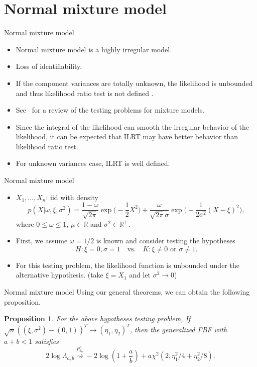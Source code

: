 \documentclass{beamer}
\theoremstyle{plain}
\newtheorem{proposition}{ Proposition}
\theoremstyle{definition}
\theoremstyle{remark}
\begin{document}
\section{Normal mixture model}
\begin{frame}{Normal mixture model}
    \begin{itemize}
        \item 
Normal mixture model is a highly irregular model.
        \item
Loss of identifiability.
\item
If the component variances are totally unknown, the likelihood is unbounded and thus likelihood ratio test is not defined \cite{Cam1990Maximum}.
\item
See~\cite{chenjiahua2017} for a review of the testing problems for mixture models.
\item
Since the integral of the likelihood can smooth the irregular behavior of the likelihood, it can be expected that ILRT may have better behavior than likelihood ratio test.
\item
For unknown variances case, ILRT is well defined.
    \end{itemize}
\end{frame}
\begin{frame}{Normal mixture model}
    \begin{itemize}
        \item 
$X_1,\ldots,X_n$: iid with density
\begin{equation*}
    p(X|\omega,\xi,\sigma^2)=\frac{1-\omega}{\sqrt{2\pi}}\exp\big(-\frac{1}{2}X^2\big)
+\frac{\omega}{\sqrt{2\pi}\sigma}\exp\big(-\frac{1}{2\sigma^2}(X-\xi)^2\big),
\end{equation*}
where $0\leq \omega \leq 1$, $\mu\in \mathbb{R}$ and $\sigma^2\in \mathbb{R}^+$.
\item
First, we assume $\omega=1/2$ is known and consider testing the hypotheses
\begin{equation*}
    H: \xi=0,\sigma=1\quad \text{vs.} \quad K: \xi\neq 0 \text{ or } \sigma \neq 1.
    \label{mixturehy1}
\end{equation*}
\item
    For this testing problem, the likelihood function is {\color{red}unbounded} under the alternative hypothesis.
    (take $\xi=X_1$ and let $\sigma^2\to 0$)
    \end{itemize}
\end{frame}
\begin{frame}{Normal mixture model}
Using our general theorems, we can obtain the following proposition.
\begin{proposition}
For the above hypotheses testing problem, 
If $\sqrt{n}((\xi,\sigma^2)-(0,1))^T\to (\eta_1,\eta_2)^T $, 
then the generalized FBF with $a+b<1$ satisfies
\begin{equation*}
    2\log \Lambda_{a,b}\overset{P^n_{\theta_n}}{\rightsquigarrow}-2\log (1+\frac{a}{b})+{a}\chi^2(2,\eta_1^2/4+\eta_2^2/8).
\end{equation*}
    \label{propositionTT}
\end{proposition}
\end{frame}
\end{document}
